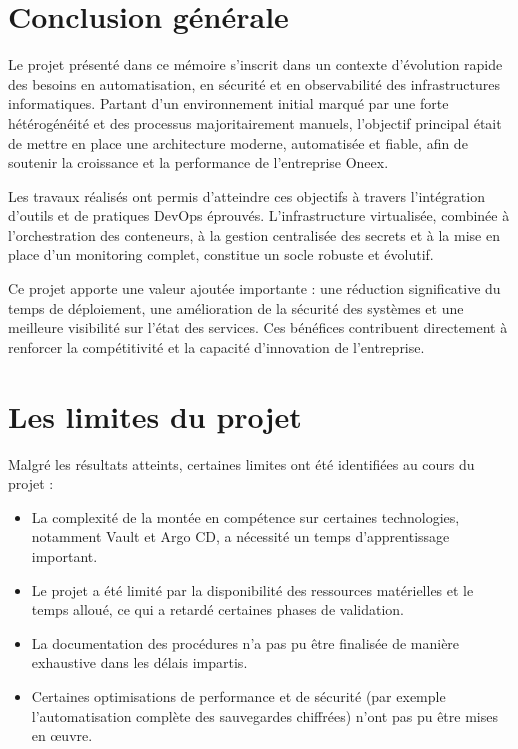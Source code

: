 \section{Conclusion générale}

Le projet présenté dans ce mémoire s’inscrit dans un contexte d’évolution rapide des besoins en automatisation, en sécurité et en observabilité des infrastructures informatiques. Partant d’un environnement initial marqué par une forte hétérogénéité et des processus majoritairement manuels, l’objectif principal était de mettre en place une architecture moderne, automatisée et fiable, afin de soutenir la croissance et la performance de l’entreprise Oneex.

Les travaux réalisés ont permis d’atteindre ces objectifs à travers l’intégration d’outils et de pratiques DevOps éprouvés. L’infrastructure virtualisée, combinée à l’orchestration des conteneurs, à la gestion centralisée des secrets et à la mise en place d’un monitoring complet, constitue un socle robuste et évolutif.

Ce projet apporte une valeur ajoutée importante : une réduction significative du temps de déploiement, une amélioration de la sécurité des systèmes et une meilleure visibilité sur l’état des services. Ces bénéfices contribuent directement à renforcer la compétitivité et la capacité d’innovation de l’entreprise.

\section{Les limites du projet}

Malgré les résultats atteints, certaines limites ont été identifiées au cours du projet :

\begin{itemize}
	\item La complexité de la montée en compétence sur certaines technologies, notamment Vault et Argo CD, a nécessité un temps d’apprentissage important.
	\item Le projet a été limité par la disponibilité des ressources matérielles et le temps alloué, ce qui a retardé certaines phases de validation.
	\item La documentation des procédures n’a pas pu être finalisée de manière exhaustive dans les délais impartis.
	\item Certaines optimisations de performance et de sécurité (par exemple l’automatisation complète des sauvegardes chiffrées) n’ont pas pu être mises en œuvre.
\end{itemize}

